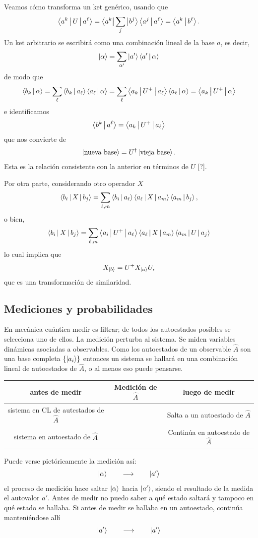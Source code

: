\documentclass[10pt,oneside]{CBFT_book}
\begin{document}
Veamos cómo transforma un ket genérico, usando que
\[
	\Braket{ a^k | U | a^\ell } = \Bra{ a^k } \sum_j \Ket{ b^j } \Braket{ a^j | a^\ell } = 
	\Braket{ a^k | b^\ell }.
\]
Un ket arbitrario se escribirá como una combinación lineal de la base $a$, es decir,
\[
	\Ket{\alpha} = \sum_{\alpha'} \Ket{a'}\Braket{a'|\alpha}
\]
de modo que 
\[
	\Braket{b_k|\alpha} = \sum_\ell \Braket{b_k|a_\ell}  \Braket{a_\ell|\alpha}  =
	\sum_\ell \Braket{a_k|U^+|a_\ell}  \Braket{a_\ell|\alpha} = \Braket{a_k|U^+|\alpha} 
\]
e identificamos
\[
	 \Braket{b^k|a^\ell} = \Braket{a_k|U^+|a_\ell} 
\]
que nos convierte de 
\[
	\Ket{\text{nueva base}} = U^\dagger \Ket{\text{vieja base}}.
\]
Esta es la relación consistente con la anterior en términos de $U$ [?].

Por otra parte, considerando otro operador $X$
\[
	\Braket{b_i | X | b_j} = \sum_{\ell,m} \Braket{b_i|a_\ell}\Braket{a_\ell|X|a_m}\Braket{a_m|b_j },
\]
o bien,
\[
	\Braket{b_i | X | b_j} = \sum_{\ell,m}\Braket{a_i|U^+|a_\ell}\Braket{a_\ell|X|a_m}\Braket{a_m|U|a_j}
\]
lo cual implica que
\[
	X_{\Ket{b}} = U^+ X_{\Ket{a}} U,
\]
que es una transformación de similaridad.


\subsection{Mediciones y probabilidades}

En mecánica cuántica medir es filtrar; de todos los autoestados posibles se selecciona uno de ellos. 
La medición perturba al sistema. Se miden variables dinámicas asociadas a observables.
Como los autoestados de un observable $\hat{A}$ son una base completa $\{\Ket{a_i}\}$ entonces un sistema se hallará en 
una combinación lineal de autoestados de $\hat{A}$, o al menos eso puede pensarse.


\begin{tabular}{|c|c|c|}
\hline
antes de medir & Medición de $\hat{A}$ & luego de medir \\
\hline 
sistema en CL
de autestados de $\hat{A}$ &  & Salta a un autoestado de $\hat{A}$ \\
\hline 
sistema en 
autoestado de $\hat{A}$  & & Continúa en autoestado de $\hat{A}$ \\
\hline
\end{tabular}

Puede verse pictóricamente la medición así:
\[
	\Ket{\alpha} \qquad \longrightarrow \qquad \Ket{a'}
\]
el proceso de medición hace saltar $\Ket{\alpha}$ hacia $\Ket{a'}$, siendo el resultado de 
la medida el autovalor $a'$.
Antes de medir no puedo saber a qué estado saltará y tampoco en qué estado se hallaba. 
Si antes de medir se hallaba en un autoestado, continúa manteniéndose allí
\[
	\Ket{a'} \qquad \longrightarrow \qquad \Ket{a'}
\]
\end{document}
